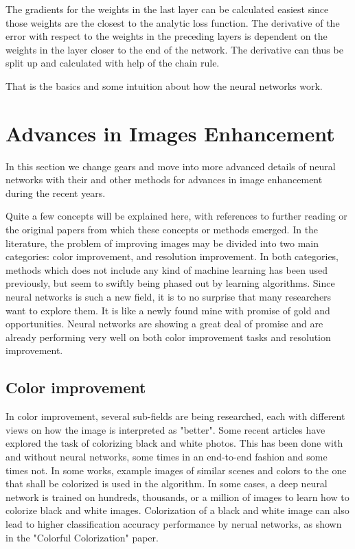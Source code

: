 The gradients for the weights in the last layer can be calculated easiest since those weights are the closest to the analytic loss function. The derivative of the error with respect to the weights in the preceding layers is dependent on the weights in the layer closer to the end of the network. The derivative can thus be split up and calculated with help of the chain rule.  

That is the basics and some intuition about how the neural networks work. 

\section{Advances in Images Enhancement}
In this section we change gears and move into more advanced details of neural networks with their and other methods for advances in image enhancement during the recent years.

Quite a few concepts will be explained here, with references to further reading or the original papers from which these concepts or methods emerged. In the literature, the problem of improving images may be divided into two main categories: color improvement, and resolution improvement. In both categories, methods which does not include any kind of machine learning has been used previously, but seem to swiftly being phased out by learning algorithms. Since neural networks is such a new field, it is to no surprise that many researchers want to explore them. It is like a newly found mine with promise of gold and opportunities. Neural networks are showing a great deal of promise and are already  performing very well on both color improvement tasks and resolution improvement. 


\subsection{Color improvement}
In color improvement, several sub-fields are being researched, each with different views on how the image is interpreted as "better". Some recent articles have explored the task of colorizing black and white photos. This has been done with and without neural networks, some times in an end-to-end fashion and some times not. In some works, example images of similar scenes and colors to the one that shall be colorized is used in the algorithm. In some cases, a deep neural network is trained on hundreds, thousands, or a million of images to learn how to colorize black and white images. Colorization of a black and white image can also lead to higher classification accuracy performance by nerual networks, as shown in the "Colorful Colorization" paper. 

